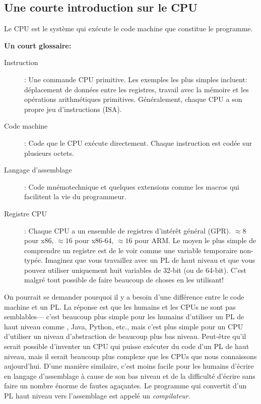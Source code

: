 \subsection{Une courte introduction sur le CPU}

Le \ac{CPU} est le système qui exécute le code machine que constitue le programme.

\textbf{Un court glossaire:}

\begin{description}
\item[Instruction]: Une commande \ac{CPU} primitive.
Les exemples les plus simples incluent: déplacement de données entre les registres, travail avec la mémoire et les opérations arithmétiques primitives.
Généralement, chaque \ac{CPU} a son propre jeu d'instructions (\ac{ISA}).

\item[Code machine]: Code que le \ac{CPU} exécute directement. 
Chaque instruction est codée sur plusieurs octets.
\item[Langage d'assemblage]: Code mnémotechnique et quelques extensions comme les macros qui facilitent la vie du programmeur.
\item[Registre CPU]: Chaque \ac{CPU} a un ensemble de registres d'intérêt général (\ac{GPR}).
$\approx 8$ pour x86, $\approx 16$ pour x86-64, $\approx 16$ pour ARM.
Le moyen le plus simple de comprendre un registre est de le voir comme une variable temporaire non-typée.
Imaginez que vous travaillez avec un \ac{PL} de haut niveau et que vous pouvez utiliser uniquement huit variables de 32-bit (ou de 64-bit).
C'est malgré tout possible de faire beaucoup de choses en les utilisant!
\end{description}


On pourrait se demander pourquoi il y a besoin d'une différence entre le code machine et un \ac{PL}. La réponse est que les humains et les \ac{CPU}s ne sont pas semblables---%
c'est beaucoup plus simple pour les humains d'utiliser un \ac{PL} de haut niveau comme \CCpp, Java, Python, etc., mais c'est plus simple pour un \ac{CPU} d'utiliser un niveau d'abstraction de beaucoup plus bas niveau.
Peut-être qu'il serait possible d'inventer un \ac{CPU} qui puisse exécuter du code d'un \ac{PL} de haut niveau, mais il serait beaucoup plus complexe que les \ac{CPU}s que nous connaissons aujourd'hui.
D'une manière similaire, c'est moins facile pour les humains d'écrire en langage d'assemblage à cause de son bas niveau et de la difficulté d'écrire sans faire un nombre énorme de fautes agaçantes.
Le programme qui convertit d'un \ac{PL} haut niveau vers l'assemblage est appelé un \emph{compilateur}.

